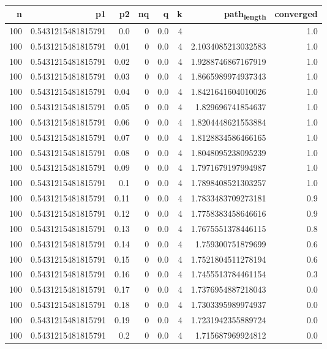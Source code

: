 \documentclass[11pt]{article}
\begin{document}
\begin{center}
\begin{tabular}{rrrrrrrr}
\hline
n & p1 & p2 & nq & q & k & path\textsubscript{length} & converged\\
\hline
100 & 0.5431215481815791 & 0.0 & 0 & 0.0 & 4 &  & 1.0\\
100 & 0.5431215481815791 & 0.01 & 0 & 0.0 & 4 & 2.1034085213032583 & 1.0\\
100 & 0.5431215481815791 & 0.02 & 0 & 0.0 & 4 & 1.9288746867167919 & 1.0\\
100 & 0.5431215481815791 & 0.03 & 0 & 0.0 & 4 & 1.8665989974937343 & 1.0\\
100 & 0.5431215481815791 & 0.04 & 0 & 0.0 & 4 & 1.8421641604010026 & 1.0\\
100 & 0.5431215481815791 & 0.05 & 0 & 0.0 & 4 & 1.829696741854637 & 1.0\\
100 & 0.5431215481815791 & 0.06 & 0 & 0.0 & 4 & 1.8204448621553884 & 1.0\\
100 & 0.5431215481815791 & 0.07 & 0 & 0.0 & 4 & 1.8128834586466165 & 1.0\\
100 & 0.5431215481815791 & 0.08 & 0 & 0.0 & 4 & 1.8048095238095239 & 1.0\\
100 & 0.5431215481815791 & 0.09 & 0 & 0.0 & 4 & 1.7971679197994987 & 1.0\\
100 & 0.5431215481815791 & 0.1 & 0 & 0.0 & 4 & 1.7898408521303257 & 1.0\\
100 & 0.5431215481815791 & 0.11 & 0 & 0.0 & 4 & 1.7833483709273181 & 0.9\\
100 & 0.5431215481815791 & 0.12 & 0 & 0.0 & 4 & 1.7758383458646616 & 0.9\\
100 & 0.5431215481815791 & 0.13 & 0 & 0.0 & 4 & 1.7675551378446115 & 0.8\\
100 & 0.5431215481815791 & 0.14 & 0 & 0.0 & 4 & 1.759300751879699 & 0.6\\
100 & 0.5431215481815791 & 0.15 & 0 & 0.0 & 4 & 1.7521804511278194 & 0.6\\
100 & 0.5431215481815791 & 0.16 & 0 & 0.0 & 4 & 1.7455513784461154 & 0.3\\
100 & 0.5431215481815791 & 0.17 & 0 & 0.0 & 4 & 1.7376954887218043 & 0.0\\
100 & 0.5431215481815791 & 0.18 & 0 & 0.0 & 4 & 1.7303395989974937 & 0.0\\
100 & 0.5431215481815791 & 0.19 & 0 & 0.0 & 4 & 1.7231942355889724 & 0.0\\
100 & 0.5431215481815791 & 0.2 & 0 & 0.0 & 4 & 1.715687969924812 & 0.0\\

\end{tabular}
\end{center}
\end{document}
